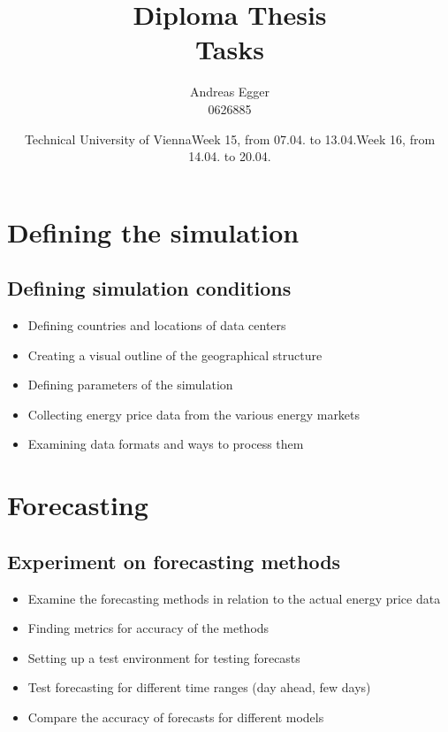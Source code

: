 \documentclass[a4paper]{article}
\title{Diploma Thesis\\Tasks}
\author{Andreas Egger \\0626885}
\date{Technical University of Vienna}
\begin{document}
\maketitle

\newpage

\tableofcontents

\newpage

\hfill\date{Week 15, from 07.04. to 13.04.}

\section{Defining the simulation}

\subsection{Defining simulation conditions}

\begin{itemize}

\item Defining countries and locations of data centers

\item Creating a visual outline of the geographical structure

\item Defining parameters of the simulation

\item Collecting energy price data from the various energy markets

\item Examining data formats and ways to process them

\end{itemize}

\vspace{1em}

\hfill\date{Week 16, from 14.04. to 20.04.}

\section{Forecasting}

\subsection{Experiment on forecasting methods}

\begin{itemize}

\item Examine the forecasting methods in relation to the actual energy price data

\item Finding metrics for accuracy of the methods

\item Setting up a test environment for testing forecasts

\item Test forecasting for different time ranges (day ahead, few days)

\item Compare the accuracy of forecasts for different models

\end{itemize}
\end{document}
